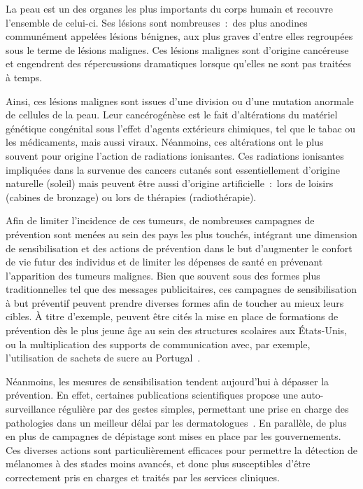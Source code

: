 \renewcommand{\thechapter}{\roman{chapter}}
\setcounter{chapter}{1}
\setcounter{figure}{0}

\label{chap:introduction}
La peau est un des organes les plus importants du corps humain et recouvre l'ensemble de celui-ci. Ses lésions sont nombreuses~:~des plus anodines communément appelées lésions bénignes, aux plus graves d'entre elles regroupées sous le terme de lésions malignes. Ces lésions malignes sont d'origine cancéreuse et engendrent des répercussions dramatiques lorsque qu'elles ne sont pas traitées à temps.\par

Ainsi, ces lésions malignes sont issues d’une division ou d’une mutation anormale de cellules de la peau. Leur cancérogénèse est le fait d'altérations du matériel génétique congénital sous l'effet d'agents extérieurs chimiques, tel que le tabac ou les médicaments, mais aussi viraux. Néanmoins, ces altérations ont le plus souvent pour origine l'action de radiations ionisantes. Ces radiations ionisantes impliquées dans la survenue des cancers cutanés sont essentiellement d'origine naturelle (soleil) mais peuvent être aussi d'origine artificielle~:~lors de loisirs (cabines de bronzage) ou lors de thérapies (radiothérapie).\par

Afin de limiter l’incidence de ces tumeurs, de nombreuses campagnes de prévention sont menées au sein des pays les plus touchés, intégrant une dimension de sensibilisation et des actions de prévention dans le but d’augmenter le confort de vie futur des individus et de limiter les dépenses de santé en prévenant l'apparition des tumeurs malignes. Bien que souvent sous des formes plus traditionnelles tel que des messages publicitaires, ces campagnes de sensibilisation à but préventif peuvent prendre diverses formes afin de toucher au mieux leurs cibles. À titre d’exemple, peuvent être cités la mise en place de formations de prévention dès le plus jeune âge au sein des structures scolaires aux États-Unis, ou la multiplication des supports de communication avec, par exemple, l’utilisation de sachets de sucre au Portugal~\cite{Guy2016,Correia2017}.\par 

Néanmoins, les mesures de sensibilisation tendent aujourd’hui à dépasser la prévention. En effet, certaines publications scientifiques propose une auto-surveillance régulière par des gestes simples, permettant une prise en charge des pathologies dans un meilleur délai par les dermatologues~\cite{Friedman1985}. En parallèle, de plus en plus de campagnes de dépistage sont mises en place par les gouvernements. Ces diverses actions sont particulièrement efficaces pour permettre la détection de mélanomes à des stades moins avancés, et donc plus susceptibles d'être correctement pris en charges et traités par les services cliniques.\par

